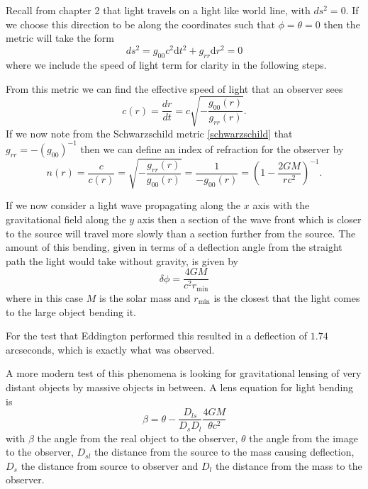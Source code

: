 Recall from chapter 2 that light travels on a light like world line, with \(ds^2 = 0\). If we choose this direction to be along the coordinates such that \(\phi = \theta = 0\) then the metric will take the form \cite{cheng}
\begin{equation} \label{light-bend-metric}
	ds^2 = g_{00} c^2 \text{d}t^2 + g_{rr} \text{d}r^2 = 0
\end{equation}
where we include the speed of light term for clarity in the following steps.

From this metric we can find the effective speed of light that an observer sees \cite{cheng}
\begin{equation} \label{speed-bending}
	c (r) = \frac{dr}{dt} = c \sqrt{- \frac{g_{00} (r)}{g_{rr} (r)}} .
\end{equation} 
If we now note from the Schwarzschild metric \eqref{schwarzschild} that \(g_{rr} = - (g_{00})^{-1}\) then we can define an index of refraction for the observer by
\begin{equation} \label{light-bend-refraction}
	n(r) = \frac{c}{c(r)} = \sqrt{- \frac{g_{rr} (r)}{g_{00} (r)}} = \frac{1}{- g_{00} (r)} = \left(1 - \frac{2 G M}{r c^2}\right)^{-1} .
\end{equation}

If we now consider a light wave propagating along the \(x\) axis with the gravitational field along the \(y\) axis then a section of the wave front which is closer to the source will travel more slowly than a section further from the source. The amount of this bending, given in terms of a deflection angle from the straight path the light would take without gravity, is given by \cite{cheng}
\begin{equation} \label{bending}
	\delta \phi = \frac{4 G M}{c^2 r_{\text{min}}}
\end{equation}
where in this case \(M\) is the solar mass and \(r_{\text{min}}\) is the closest that the light comes to the large object bending it.

For the test that Eddington performed this resulted in a deflection of \(1.74\) arcseconds, which is exactly what was observed.

A more modern test of this phenomena is looking for gravitational lensing of very distant objects by massive objects in between. A lens equation for light bending is
\begin{equation} \label{lens}
	\beta = \theta - \frac{D_{ls}}{D_{s} D_{l}} \frac{4 G M}{\theta c^2}
\end{equation}
with \(\beta\) the angle from the real object to the observer, \(\theta\) the angle from the image to the observer, \(D_{sl}\) the distance from the source to the mass causing deflection, \(D_{s}\) the distance from source to observer and \(D_{l}\) the distance from the mass to the observer. 

